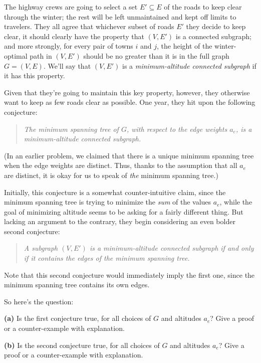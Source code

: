 \documentclass[12pt]{article}
\def\gap{0.2in}
\begin{document}
\begin{enumerate}
The highway crews are going to select a set $E' \subseteq E$
of the roads to keep clear through the winter;
the rest will be left unmaintained and kept off limits to travelers.
They all agree that whichever subset of roads $E'$
they decide to keep clear, it should clearly have the property
that $(V,E')$ is a connected subgraph;
and more strongly,
for every pair of towns $i$ and $j$, the
height of the winter-optimal path in $(V,E')$
should be no greater than it is in the full graph $G = (V,E)$.
We'll say that $(V,E')$ is a
{\em minimum-altitude connected subgraph}
if it has this property.

Given that they're going to maintain this key property, however,
they otherwise want to keep as few roads clear as possible.
One year, they hit upon the following conjecture:
\begin{quote}
{\em The minimum spanning tree of $G$, with respect
to the edge weights $a_e$, is a
minimum-altitude connected subgraph.}
\end{quote}
(In an earlier problem, we claimed that there is a unique
minimum spanning tree when the edge weights are distinct.
Thus, thanks to the assumption that all $a_e$ are distinct, it is okay for
us to speak of {\em the} minimum spanning tree.)

Initially, this conjecture is a somewhat counter-intuitive claim,
since the minimum spanning tree is trying to minimize
the {\em sum} of the values $a_e$,
while the goal of minimizing altitude seems to
be asking for a fairly different thing.
But lacking an argument to the contrary,
they begin considering an even bolder second conjecture:
\begin{quote}
{\em A subgraph $(V,E')$ is a
minimum-altitude connected subgraph if and only if
it contains the edges of the minimum spanning tree.}
\end{quote}
Note that this second conjecture would immediately
imply the first one, since the minimum spanning tree
contains its own edges.

So here's the question:

\vskip \gap
{\bf (a)} Is the first conjecture true, for all choices
of $G$ and altitudes $a_e$?
Give a proof or a counter-example with explanation.

\vskip \gap
{\bf (b)} Is the second conjecture true, for all choices
of $G$ and altitudes $a_e$?
Give a proof or a counter-example with explanation.


\end{enumerate}
\end{document}
